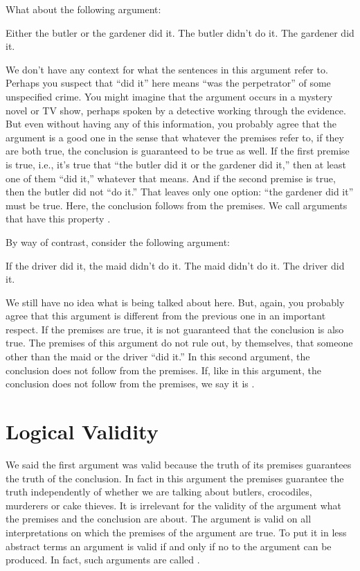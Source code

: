What about the following argument:
\begin{earg}
	\prem Either the butler or the gardener did it.
	\prem The butler didn't do it.
	\conc The gardener did it.
\end{earg}
We don't have any context for what the sentences in this argument refer to. Perhaps you suspect that ``did it'' here means ``was the perpetrator'' of some unspecified crime. You might imagine that the argument occurs in a mystery novel or TV show, perhaps spoken by a detective working through the evidence. But even without having any of this information, you probably agree that the argument is a good one in the sense that whatever the premises refer to, if they are both true, the conclusion is guaranteed to be true as well. If the first premise is true, i.e., it's true that ``the butler did it or the gardener did it,'' then at least one of them ``did it,'' whatever that means. And if the second premise is true, then the butler did not ``do it.'' That leaves only one option: ``the gardener did it'' must be true. Here, the conclusion follows from the premises. We call arguments that have this property .

By way of contrast, consider the following argument:
\begin{earg}\label{argMaidDriver}
	\prem If the driver did it, the maid didn't do it.
	\prem The maid didn't do it.
	\conc The driver did it.
\end{earg}
We still have no idea what is being talked about here. But, again, you probably agree that this argument is different from the previous one in an important respect. If the premises are true, it is not guaranteed that the conclusion is also true. The premises of this argument do not rule out, by themselves, that someone other than the maid or the driver ``did it.'' In this second argument, the conclusion does not follow from the premises. If, like in this argument, the conclusion does not follow from the premises, we say it is .


\section{Logical Validity}
We said the first argument was valid because the truth of its premises guarantees the truth of the conclusion. In fact in this argument the premises guarantee the truth independently of whether we are talking about butlers, crocodiles, murderers or cake thieves. It is irrelevant for the validity of the argument what the premises and the conclusion are about. The argument is valid on all interpretations on which the  premises of the argument are true. To put it in less abstract terms an argument is valid if and only if no  to the argument can be produced. In fact, such arguments are called .

